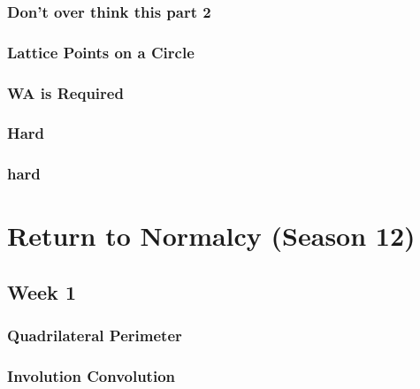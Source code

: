 \documentclass[titlepage=true]{scrartcl}
\begin{document}
        \subsubsection{Don't over think this part 2}
        \label{11-2-1}
        
        \newpage

        \subsubsection{Lattice Points on a Circle}
        \label{11-2-2}
        
        \newpage

        \subsubsection{WA is Required}
        \label{11-2-3}
        
        \newpage

        \subsubsection{Hard}
        \label{11-2-4}
        
        \newpage

        \subsubsection{hard}
        \label{11-2-5}
        
        \newpage

\section{Return to Normalcy (Season 12)}

    \subsection{Week 1}
        
    \subsubsection{Quadrilateral Perimeter}
	\label{12-1-1}
	
	\newpage

    \subsubsection{Involution Convolution}
	\label{12-1-2}
	
	\newpage
\end{document}
